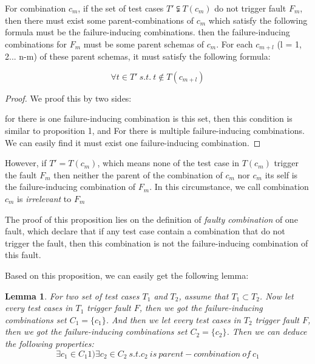\documentclass{sig-alternate}
\begin{document}
\begin{proposition}
For combination $c_{m}$, if the set of test cases $T' \subsetneqq T(c_{m})$ do not trigger fault $F_{m}$, then there must exist some parent-combinations of $c_{m}$ which satisfy the following formula must be the failure-inducing combinations. then the failure-inducing combinations for $F_{m}$ must be some parent schemas of $c_{m}$. For each $c_{m+l}$ (l = 1, 2... n-m) of these parent schemas, it must satisfy the following formula:

\begin{displaymath}  \forall t \in T'\ s.t.\ t \notin T(c_{m+l})\end{displaymath}


\end{proposition}

\begin{proof}
We proof this by two sides:

for there is one failure-inducing combination is this set, then this condition is similar to proposition 1, and For there is multiple failure-inducing combinations. We can easily find it must exist one failure-inducing combination.
\end{proof}

However, if $T' = T(c_{m})$, which means none of the test case in $T(c_{m})$ trigger the fault $F_{m}$ then neither the parent of the combination of $c_{m}$ nor $c_{m}$ its self is the failure-inducing combination of $F_{m}$. In this circumstance, we call combination $c_{m}$ is \emph{irrelevant} to $F_{m}$


The proof of this proposition lies on the definition of \emph{faulty combination} of one fault, which declare that if any test case contain a combination that do not trigger the fault, then this combination is not the failure-inducing combination of this fault.

Based on this proposition, we can easily get the following lemma:

\newtheorem{lemma}{Lemma}
\begin{lemma}
For two set of test cases $T_{1}$ and $T_{2}$, assume that $T_{1} \subset T_{2}$. Now let every test cases in $T_{1}$ trigger fault $F$, then we got the failure-inducing combinations set $C_{1} = \{ c_{1} \}$. And then we let every test cases in $T_{2}$ trigger fault $F$, then we got the failure-inducing combinations set $C_{2} = \{ c_{2}\}$. Then we can deduce the following properties:
\begin{displaymath}
\exists c_{1} \in C_{1} 1) \exists c_{2} \in C_{2} \ s.t. c_{2}\ is\ parent-combination\ of\ c_{1} \end{displaymath}
\end{lemma}
\end{document}
